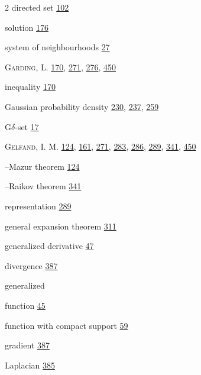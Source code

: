 \begin{multicols}{2}
\hspace*{1.1em}directed set \hyperlink{page.102}{102}\par
\hspace*{1.1em}solution \hyperlink{page.176}{176}\par
\hspace*{1.1em}system of neighbourhoods \hyperlink{page.27}{27}\par
\noindent \textsc{Garding}, L. \hyperlink{page.170}{170}, \hyperlink{page.271}{271}, \hyperlink{page.276}{276}, \hyperlink{page.450}{450}\par
\hspace*{1.1em}inequality \hyperlink{page.170}{170}\par
\noindent Gaussian probability density \hyperlink{page.230}{230}, \hyperlink{page.237}{237}, \hyperlink{page.259}{259}\par
\noindent G$\delta$-set \hyperlink{page.17}{17}\par
\noindent \textsc{Gelfand}, I. M. \hyperlink{page.124}{124}, \hyperlink{page.161}{161}, \hyperlink{page.271}{271}, \hyperlink{page.283}{283}, \hyperlink{page.286}{286}, \hyperlink{page.289}{289}, \hyperlink{page.341}{341}, \hyperlink{page.450}{450}\par
\hspace*{1.1em}--Mazur theorem \hyperlink{page.124}{124}\par
\hspace*{1.1em}--Raikov theorem \hyperlink{page.341}{341}\par
\hspace*{1.1em}representation \hyperlink{page.289}{289}\par
\noindent general expansion theorem \hyperlink{page.311}{311}\par
\noindent generalized derivative \hyperlink{page.47}{47}\par
\hspace*{1.1em}divergence \hyperlink{page.387}{387}\par
\noindent generalized\par
\hspace*{1.1em}function \hyperlink{page.45}{45}\par
\hspace*{1.1em}function with compact support \hyperlink{page.59}{59}\par
\hspace*{1.1em}gradient \hyperlink{page.387}{387}\par
\hspace*{1.1em}Laplacian \hyperlink{page.385}{385}\par

\end{multicols}
